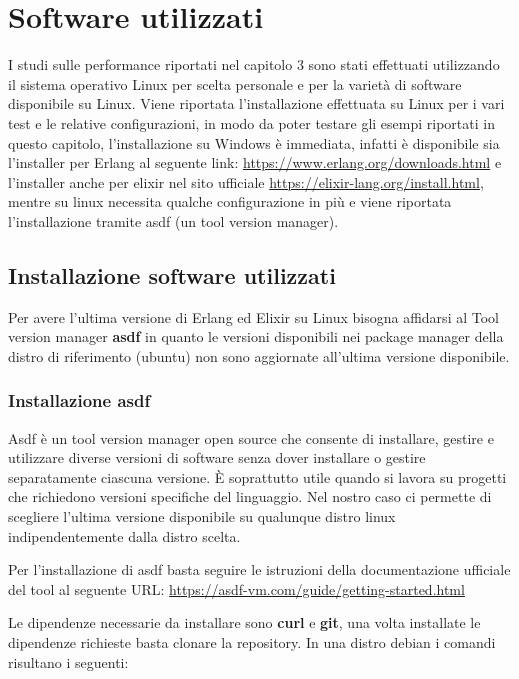 \section{Software utilizzati}

I studi sulle performance riportati nel capitolo 3
sono stati effettuati
utilizzando il sistema operativo Linux per scelta personale e
per la varietà di software disponibile su Linux.
Viene riportata l'installazione effettuata su Linux per i vari test e le
relative configurazioni, in modo da poter testare gli esempi
riportati in questo capitolo, l'installazione su Windows è immediata,
infatti è disponibile sia l'installer per Erlang al seguente link: \url{https://www.erlang.org/downloads.html}
e l'installer anche per elixir nel sito ufficiale \url{https://elixir-lang.org/install.html},
mentre su linux necessita qualche configurazione in più e viene riportata
l'installazione tramite asdf (un tool version manager).

\subsection{Installazione software utilizzati} 

Per avere l'ultima versione di Erlang ed Elixir
su Linux bisogna affidarsi al Tool version manager \textbf{asdf}
in quanto le versioni disponibili nei
package manager della distro di riferimento (ubuntu) non sono
aggiornate all'ultima versione disponibile.
\subsubsection{Installazione asdf}

Asdf è un tool version manager open source che consente di installare,
gestire e utilizzare diverse versioni di software senza dover
installare o gestire separatamente ciascuna versione. È soprattutto
utile quando si lavora su progetti che richiedono versioni specifiche
del linguaggio. Nel nostro caso ci permette di scegliere l'ultima
versione disponibile su qualunque distro linux indipendentemente
dalla distro scelta.

Per l'installazione di asdf basta seguire le istruzioni della
documentazione ufficiale del tool al seguente URL: \url{https://asdf-vm.com/guide/getting-started.html}

\newpage
Le dipendenze necessarie da installare sono \textbf{curl} e \textbf{git},
una volta installate le dipendenze richieste basta clonare la repository.
In una distro debian i comandi risultano i seguenti:

